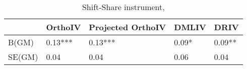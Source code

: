 \begin{table}\centering\caption{Shift-Share instrument, }\begin{tabular}{lllll}
\toprule
        & OrthoIV   & Projected OrthoIV   & DMLIV   & DRIV   \\
\midrule
 B(GM)  & 0.13***   & 0.13***             & 0.09*   & 0.09** \\
 SE(GM) & 0.04      & 0.04                & 0.06    & 0.04   \\
\bottomrule
\end{tabular}\end{table}